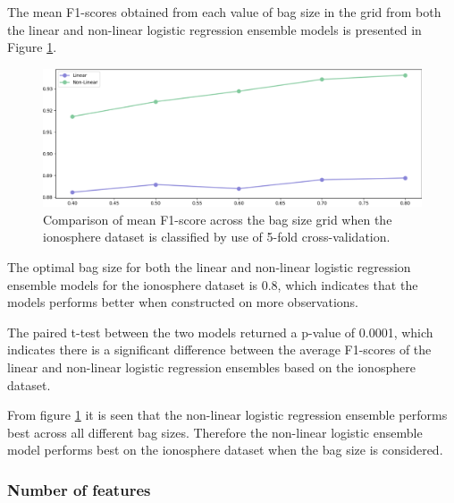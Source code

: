 \documentclass[10pt, conference]{IEEEtran}
\begin{document}
The mean F1-scores obtained from each value of bag size in the grid from both the linear and non-linear
logistic regression ensemble models is presented in Figure \ref{fig:I_bag_comparison}.
\begin{figure}[H]
    \centerline{\includegraphics[scale=0.26]{../Images/I_bag.PNG}}
    \caption{Comparison of mean F1-score across the bag size grid when the ionosphere dataset is classified by use of 5-fold cross-validation.}
    \label{fig:I_bag_comparison}
\end{figure}
The optimal bag size for both the linear and non-linear logistic regression ensemble models for the ionosphere dataset is 0.8, which
indicates that the models performs better when constructed on more observations.

The paired t-test between the two models returned a p-value of 0.0001, which indicates there is a significant difference
between the average F1-scores of the linear and non-linear logistic regression ensembles based on the ionosphere dataset.

From figure \ref{fig:I_bag_comparison} it is seen that the non-linear logistic regression ensemble performs best across
all different bag sizes. Therefore the non-linear logistic ensemble model performs best on the ionosphere dataset when the
bag size is considered.

\subsubsection{Number of features}
\end{document}
